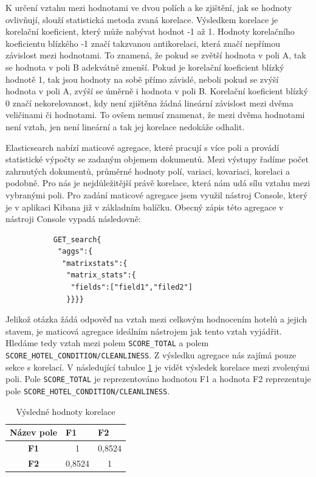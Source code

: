 \documentclass[czech,BP]{thesiskiv}
\begin{document}
K určení vztahu mezi hodnotami ve dvou polích a ke zjištění, jak se hodnoty ovlivňují, slouží statistická metoda zvaná korelace. Výsledkem korelace je korelační koeficient, který může nabývat hodnot -1 až 1. Hodnoty korelačního koeficientu blízkého -1 značí takzvanou antikorelaci, která značí nepřímou závislost mezi hodnotami. To znamená, že pokud se zvětší hodnota v poli A, tak se hodnota v poli B adekvátně zmenší. Pokud je korelační koeficient blízký hodnotě 1, tak jsou hodnoty na sobě přímo závislé, neboli pokud se zvýší hodnota v poli A, zvýší se úměrně i hodnota v poli B. Korelační koeficient blízký 0 značí nekorelovanost, kdy není zjištěna žádná lineární závislost mezi dvěma veličinami či hodnotami. To ovšem nemusí znamenat, že mezi dvěma hodnotami není vztah, jen není lineární a tak jej korelace nedokáže odhalit.\cite{Korelace}


Elasticsearch nabízí maticové agregace, které pracují s více poli a provádí statistické výpočty se zadaným objemem dokumentů. Mezi výstupy řadíme počet zahrnutých dokumentů, průměrné hodnoty polí, variaci, kovariaci, korelaci a podobně. Pro nás je nejdůležitější právě korelace, která nám udá sílu vztahu mezi vybranými poli.\cite{MatrixAggs}
Pro zadání maticové agregace jsem využil nástroj Console, který je v aplikaci Kibana již v základním balíčku. Obecný zápis této agregace v nástroji Console vypadá následovně:


\begin{lstlisting}
	       GET_search{
	        "aggs":{
	         "matrixstats":{
	          "matrix_stats":{
	           "fields":["field1","filed2"]
	          }}}}
\end{lstlisting}


Jelikož otázka žádá odpověď na vztah mezi celkovým hodnocením hotelů a jejich stavem, je maticová agregace ideálním nástrojem jak tento vztah vyjádřit. Hledáme tedy vztah mezi polem \texttt{SCORE\_TOTAL}  a polem \texttt{SCORE\_HO\-TEL\_CONDITION/CLEANLINESS}. Z výsledku agregace nás zajímá pouze sekce s korelací. V následující tabulce \ref{my-label} je vidět výsledek korelace mezi zvolenými poli. Pole \texttt{SCORE\_TOTAL} je reprezentováno hodnotou F1 a hodnota F2 reprezentuje pole \texttt{SCORE\_HO\-TEL\_CONDITION/CLEANLINESS}.

\begin{table}[h]
	\centering
	
	\begin{tabular}{c|c c}
		
		\multicolumn{1}{l|}{\textbf{Název pole}} & \multicolumn{1}{l}{\textbf{F1}} & \multicolumn{1}{l}{\textbf{F2}} \\ \hline
		\textbf{F1} & 1 & 0,8524 \\ 
		\textbf{F2} & 0,8524 & 1 \\ 
	\end{tabular}
\caption{Výsledné hodnoty korelace}
\label{my-label}
\end{table}
\end{document}
